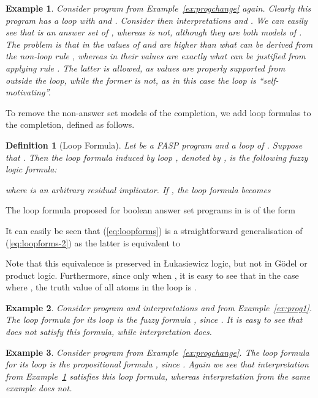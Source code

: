 \documentclass{tlp}
\newtheorem{definition}{Definition}
\newtheorem{example}{Example}
\begin{document}
\begin{example}\label{ex:prog2}
 Consider program  from Example~\ref{ex:progchange} again.
 Clearly this program has a loop  with  and . Consider then interpretations  and . We can easily see that  is an answer set of , whereas  is not, although they are both models of . The problem is that in  the values of  and  are higher than what can be derived from the non-loop rule , whereas in  their values are exactly what can be justified from applying rule .
 The latter is allowed, as values are properly supported from outside the loop, while the former is not, as in this case the loop is ``self-motivating''.
\end{example}

To remove the non-answer set models of the completion, we add loop formulas to the completion, defined as follows.

\begin{definition}[Loop Formula]\label{def:loopformula}
 Let  be a FASP program and  a loop of . Suppose that . Then the loop formula induced by loop , denoted by , is the following fuzzy logic formula:
  
 where  is an arbitrary residual implicator. If , the loop formula becomes
  
\end{definition}

 The loop formula proposed for boolean answer set programs in \cite{assat-linzhao} is of the form
  
  
It can easily be seen that (\ref{eq:loopforms}) is a straightforward generalisation of (\ref{eq:loopforms-2}) as the latter is equivalent to
 
Note that this equivalence is preserved in \L ukasiewicz logic, but not in G\"odel or product logic.
 Furthermore, since  only when    , it is easy to see that in the case where , the truth value of all atoms in the loop  is .
 
\begin{example}
 Consider program  and interpretations  and  from Example~\ref{ex:prog1}. The loop formula for its loop  is the fuzzy formula , since . It is easy to see that  does not satisfy this formula, while interpretation  does. 
\end{example}

\begin{example}
 Consider program  from Example~\ref{ex:progchange}. The loop formula for its loop  is the propositional formula , since . Again we see that interpretation  from Example~\ref{ex:prog2} satisfies this loop formula, whereas interpretation  from the same example does not.
\end{example}
 
\end{document}
